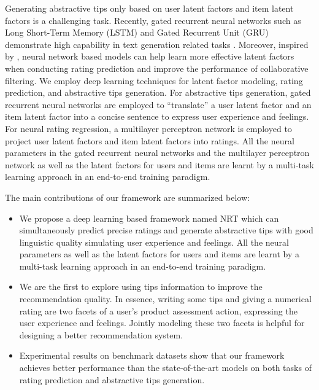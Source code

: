 \documentclass[sigconf]{acmart}
\begin{document}
Generating abstractive tips only based on user latent factors and item latent factors is a challenging task.
Recently, gated recurrent neural networks such as Long Short-Term Memory (LSTM) \cite{hochreiter1997long} and Gated Recurrent Unit (GRU) \cite{cho2014learning} demonstrate high capability in text generation related tasks \cite{bahdanau2014neural,rush2015neural}.
Moreover, inspired by \cite{he2017neural,wang2015collaborative}, neural network based models can help learn more effective latent factors when conducting rating prediction and improve the performance of collaborative filtering.
We employ deep learning techniques for latent factor modeling, rating prediction, and abstractive tips generation.
For abstractive tips generation, gated recurrent neural networks are employed to ``translate'' a user latent factor and an item latent factor into a concise sentence to express user experience and feelings.
For neural rating regression, a multilayer perceptron network \cite{rosenblatt1961principles} is employed to project user latent factors and item latent factors into ratings.
All the neural parameters in the gated recurrent neural networks and the multilayer perceptron network as well as the latent factors for users and items are learnt by a multi-task learning approach in an end-to-end training paradigm.


The main contributions of our framework are summarized below:
\begin{itemize}
	
	\item We propose a deep learning based framework named NRT which can simultaneously predict precise ratings and generate abstractive tips with good linguistic quality  simulating user experience and feelings.
	All the neural parameters as well as the latent factors for users and items are learnt by a multi-task learning approach in an end-to-end training paradigm.
	
	\item We are the first to explore using tips information to improve the recommendation quality. In essence, writing some tips and giving a numerical rating are two facets of a user's product assessment action, expressing the user experience and feelings. Jointly modeling these two facets is helpful for designing a better recommendation system.
	
	\item Experimental results on benchmark datasets show that our framework achieves better performance than the state-of-the-art models on both tasks of rating prediction and abstractive tips generation.
\end{itemize}
\end{document}
